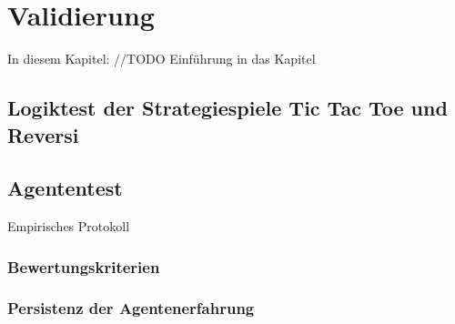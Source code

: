 \chapter{Validierung}
\label{cha:Validierung}

In diesem Kapitel: //TODO Einführung in das Kapitel

\section{Logiktest der Strategiespiele Tic Tac Toe und Reversi}

\section{Agententest}
Empirisches Protokoll

\subsection{Bewertungskriterien}

\subsection{Persistenz der Agentenerfahrung}

